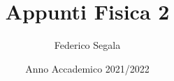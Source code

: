 \documentclass[a4paper,12pt]{book}
\begin{document}
\author{Federico Segala}
\title{Appunti Fisica 2 }
\date{Anno Accademico 2021/2022}

\frontmatter
\maketitle
\tableofcontents

\mainmatter





\backmatter
\end{document}
